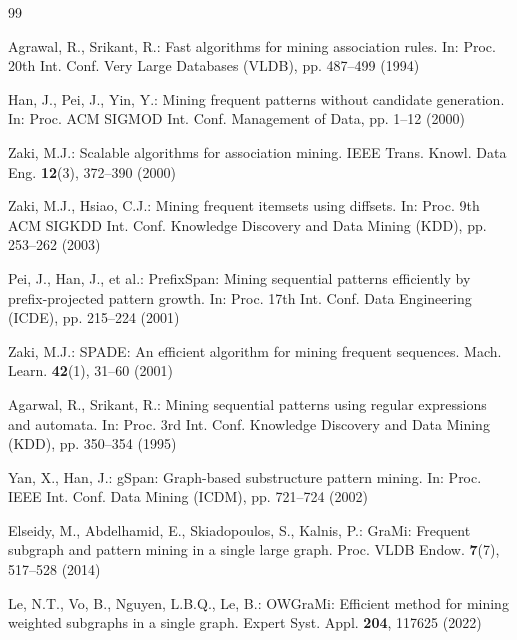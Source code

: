 
\begin{thebibliography}{99}

Agrawal, R., Srikant, R.:
Fast algorithms for mining association rules.
In: Proc. 20th Int. Conf. Very Large Databases (VLDB), pp. 487--499 (1994)

Han, J., Pei, J., Yin, Y.:
Mining frequent patterns without candidate generation.
In: Proc. ACM SIGMOD Int. Conf. Management of Data, pp. 1--12 (2000)

Zaki, M.J.:
Scalable algorithms for association mining.
IEEE Trans. Knowl. Data Eng. \textbf{12}(3), 372--390 (2000)

Zaki, M.J., Hsiao, C.J.:
Mining frequent itemsets using diffsets.
In: Proc. 9th ACM SIGKDD Int. Conf. Knowledge Discovery and Data Mining (KDD),
pp. 253--262 (2003)

Pei, J., Han, J., et al.:
PrefixSpan: Mining sequential patterns efficiently by prefix-projected pattern growth.
In: Proc. 17th Int. Conf. Data Engineering (ICDE), pp. 215--224 (2001)

Zaki, M.J.:
SPADE: An efficient algorithm for mining frequent sequences.
Mach. Learn. \textbf{42}(1), 31--60 (2001)

Agarwal, R., Srikant, R.:
Mining sequential patterns using regular expressions and automata.
In: Proc. 3rd Int. Conf. Knowledge Discovery and Data Mining (KDD), pp. 350--354 (1995)

Yan, X., Han, J.:
gSpan: Graph-based substructure pattern mining.
In: Proc. IEEE Int. Conf. Data Mining (ICDM), pp. 721--724 (2002)

Elseidy, M., Abdelhamid, E., Skiadopoulos, S., Kalnis, P.:
GraMi: Frequent subgraph and pattern mining in a single large graph.
Proc. VLDB Endow. \textbf{7}(7), 517--528 (2014)

Le, N.T., Vo, B., Nguyen, L.B.Q., Le, B.:
OWGraMi: Efficient method for mining weighted subgraphs in a single graph.
Expert Syst. Appl. \textbf{204}, 117625 (2022)


\end{thebibliography}
